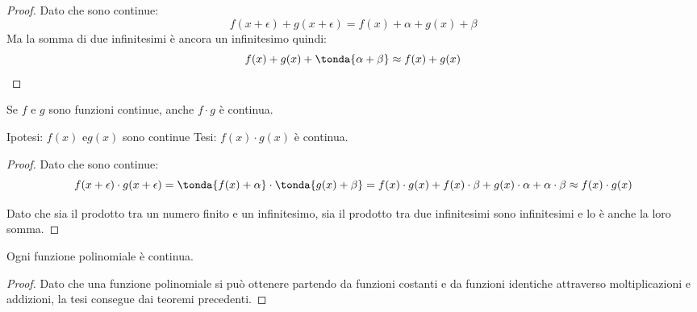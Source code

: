 \begin{proof}
Dato che sono continue: 
\[f(x+\epsilon) + g(x+\epsilon) = f(x)+\alpha + g(x)+\beta\]
Ma la somma di due infinitesimi è ancora un infinitesimo quindi:
\[f(x)+g(x)+\tonda{\alpha + \beta} \approx f(x)+g(x)\]
\end{proof}

\begin{teorema}
Se \(f\) e \(g\) sono funzioni continue, anche \(f \cdot g\) è continua.
\end{teorema}

\noindent Ipotesi: 
\(f(x) \text{ e} g(x)\) sono continue
\tab Tesi: 
\(f(x) \cdot g(x)\) è continua.

\begin{proof}
Dato che sono continue: 
\[f(x+\epsilon) \cdot g(x+\epsilon) = 
\tonda{f(x)+\alpha} \cdot \tonda{g(x)+\beta} = 
f(x) \cdot g(x) + f(x) \cdot \beta + g(x) \cdot \alpha + \alpha \cdot \beta
\approx f(x) \cdot g(x)\]

Dato che sia il prodotto tra un numero finito e un infinitesimo, sia il 
prodotto tra due infinitesimi sono infinitesimi e lo è anche la loro somma. 
\end{proof}

\begin{corollario}
 Ogni funzione polinomiale è continua.
\end{corollario}

\begin{proof}
Dato che una funzione polinomiale si può ottenere partendo da funzioni 
costanti e da funzioni identiche attraverso moltiplicazioni e addizioni, 
la tesi consegue dai teoremi precedenti. 
\end{proof}

